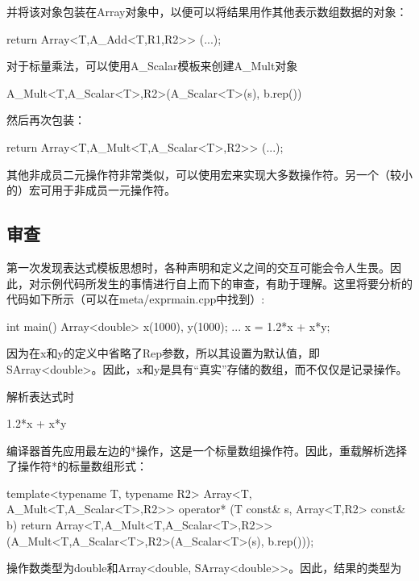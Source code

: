 并将该对象包装在Array对象中，以便可以将结果用作其他表示数组数据的对象：

\begin{cpp}
return Array<T,A_Add<T,R1,R2>> (...);
\end{cpp}

对于标量乘法，可以使用A\_Scalar模板来创建A\_Mult对象

\begin{cpp}
A_Mult<T,A_Scalar<T>,R2>(A_Scalar<T>(s), b.rep())
\end{cpp}

然后再次包装：

\begin{cpp}
return Array<T,A_Mult<T,A_Scalar<T>,R2>> (...);
\end{cpp}

其他非成员二元操作符非常类似，可以使用宏来实现大多数操作符。另一个（较小的）宏可用于非成员一元操作符。

\subsection{审查}

第一次发现表达式模板思想时，各种声明和定义之间的交互可能会令人生畏。因此，对示例代码所发生的事情进行自上而下的审查，有助于理解。这里将要分析的代码如下所示（可以在meta/exprmain.cpp中找到）:

\begin{cpp}
int main()
{
	Array<double> x(1000), y(1000);
	...
	x = 1.2*x + x*y;
}
\end{cpp}

因为在x和y的定义中省略了Rep参数，所以其设置为默认值，即SArray<double>。因此，x和y是具有“真实”存储的数组，而不仅仅是记录操作。

解析表达式时

\begin{cpp}
1.2*x + x*y
\end{cpp}

编译器首先应用最左边的*操作，这是一个标量数组操作符。因此，重载解析选择了操作符*的标量数组形式：

\begin{cpp}
template<typename T, typename R2>
Array<T, A_Mult<T,A_Scalar<T>,R2>>
operator* (T const& s, Array<T,R2> const& b) {
	return Array<T,A_Mult<T,A_Scalar<T>,R2>>
		(A_Mult<T,A_Scalar<T>,R2>(A_Scalar<T>(s), b.rep()));
}
\end{cpp}

操作数类型为double和Array<double, SArray<double>{}>。因此，结果的类型为

